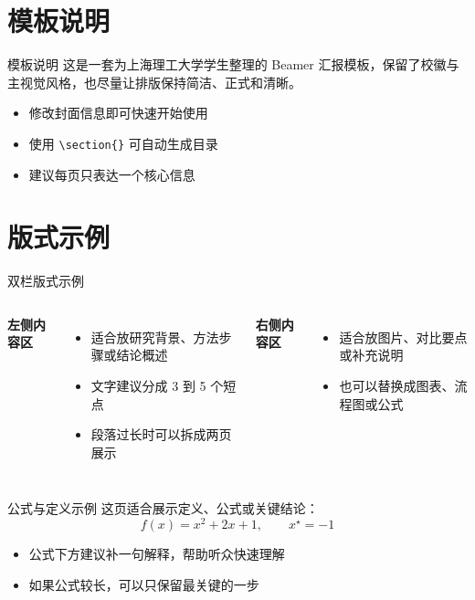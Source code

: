 \documentclass[aspectratio=169]{beamer}
\title[\titleplaceholder]{\titleplaceholder}
\subtitle{\subtitleplaceholder}
\author{\authorplaceholder}
\institute{\instituteplaceholder}
\date{\today}
\begin{document}
\ussttitleframe
\usstoutlineframe

\section{模板说明}
\begin{frame}{模板说明}
\large
这是一套为上海理工大学学生整理的 Beamer 汇报模板，保留了校徽与主视觉风格，也尽量让排版保持简洁、正式和清晰。

\vspace{0.3cm}
\begin{itemize}
  \item 修改封面信息即可快速开始使用
  \item 使用 \texttt{\textbackslash section\{\}} 可自动生成目录
  \item 建议每页只表达一个核心信息
\end{itemize}
\end{frame}

\section{版式示例}
\begin{frame}{双栏版式示例}
\begin{columns}[T,onlytextwidth]
\large
\textbf{左侧内容区}
\begin{itemize}
  \item 适合放研究背景、方法步骤或结论概述
  \item 文字建议分成 3 到 5 个短点
  \item 段落过长时可以拆成两页展示
\end{itemize}

\large
\textbf{右侧内容区}
\begin{itemize}
  \item 适合放图片、对比要点或补充说明
  \item 也可以替换成图表、流程图或公式
\end{itemize}
\end{columns}
\end{frame}

\begin{frame}{公式与定义示例}
\large
这页适合展示定义、公式或关键结论：
\[
f(x)=x^2+2x+1,\qquad x^\star=-1
\]

\vspace{0.25cm}
\begin{itemize}
  \item 公式下方建议补一句解释，帮助听众快速理解
  \item 如果公式较长，可以只保留最关键的一步
\end{itemize}
\end{frame}
\end{document}

